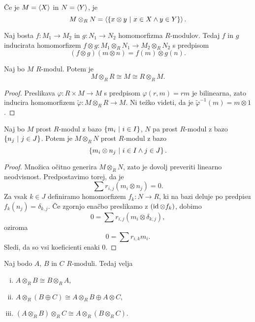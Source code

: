 \begin{opomba}
Če je $M = \left\langle X\right\rangle$ in $N = \left\langle Y\right\rangle$, je
\[
M \otimes_R N = \left\langle \left\{x \otimes y~\middle\vert~x \in X \land y \in Y\right\}\right\rangle.
\]
\end{opomba}

\begin{opomba}
Naj bosta $f \colon M_1 \to M_2$ in $g \colon N_1 \to N_2$
homomorfizma $R$-modulov. Tedaj $f$ in $g$ inducirata homomorfizem
$f \otimes g \colon M_1 \otimes_R N_1 \to M_2 \otimes_R N_2$ s
predpisom
\[
(f \otimes g)(m \otimes n) = f(m) \otimes g(n).
\]
\end{opomba}

\begin{trditev}
Naj bo $M$ $R$-modul. Potem je
\[
M \otimes_R R \cong M \cong R \otimes_R M.
\]
\end{trditev}

\begin{proof}
Preslikava $\varphi \colon R \times M \to M$ s predpisom
$\varphi(r, m) = rm$ je bilinearna, zato inducira homomorfizem
$\tilde{\varphi} \colon M \otimes_R R \to M$. Ni težko videti, da
je $\tilde{\varphi}^{-1}(m) = m \otimes 1$.
\end{proof}

\begin{trditev}
Naj bo $M$ prost $R$-modul z bazo $\left\{m_i~\middle\vert~i \in I\right\}$, $N$ pa
prost $R$-modul z bazo $\left\{n_j~\middle\vert~j \in J\right\}$. Potem je
$M \otimes_R N$ prost $R$-modul z bazo
\[
\left\{m_i \otimes n_j~\middle\vert~i \in I \land j \in J\right\}.
\]
\end{trditev}

\begin{proof}
Množica očitno generira $M \otimes_R N$, zato je dovolj preveriti
linearno neodvisnost. Predpostavimo torej, da je
\[
\sum r_{i,j} (m_i \otimes n_j) = 0.
\]
Za vsak $k \in J$ definiramo homomorfizem $f_k \colon N \to R$,
ki na bazi deluje po predpisu $f_k(n_j) = \delta_{k,j}$. Če
zgornjo enačbo preslikamo z $(\operatorname{id} \otimes f_k)$, dobimo
\[
0 = \sum r_{i,j} (m_i \otimes \delta_{k,j}),
\]
oziroma
\[
0 = \sum r_{i,k} m_i.
\]
Sledi, da so vsi koeficienti enaki $0$.
\end{proof}

\begin{trditev}
Naj bodo $A$, $B$ in $C$ $R$-moduli. Tedaj velja

\begin{enumerate}[i)]
\item $A \otimes_R B \cong B \otimes_R A$,
\item $A \otimes_R (B \oplus C) \cong
A \otimes_R B \oplus A \otimes C$,
\item $(A \otimes_R B) \otimes_R C \cong
A \otimes_R (B \otimes_R C)$.
\end{enumerate}
\end{trditev}

